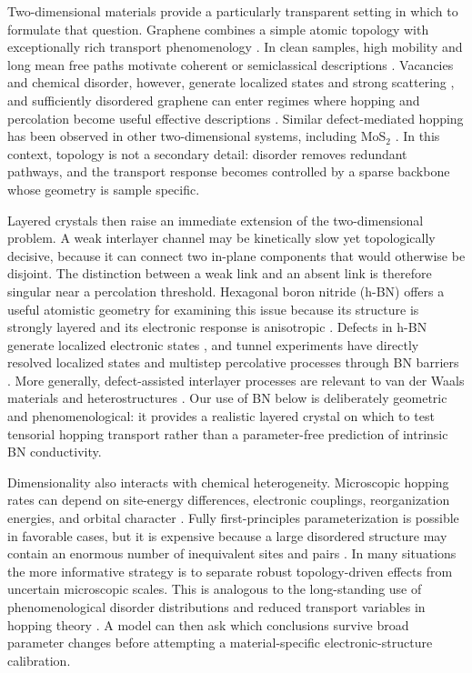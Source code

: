 \documentclass[aps,prmaterials,reprint,amsmath,amssymb,superscriptaddress,longbibliography]{revtex4-2}
\begin{document}
Two-dimensional materials provide a particularly transparent setting in which to formulate that question. Graphene combines a simple atomic topology with exceptionally rich transport phenomenology \cite{novoselov2004,geim2007,castroneto2009,peres2010}. In clean samples, high mobility and long mean free paths motivate coherent or semiclassical descriptions \cite{morozov2008,bolotin2008,hwang2008}. Vacancies and chemical disorder, however, generate localized states and strong scattering \cite{pereira2006,ugeda2010,chen2009}, and sufficiently disordered graphene can enter regimes where hopping and percolation become useful effective descriptions \cite{lherbier2008,lherbier2012,liang2012}. Similar defect-mediated hopping has been observed in other two-dimensional systems, including MoS$_2$ \cite{qiu2013}. In this context, topology is not a secondary detail: disorder removes redundant pathways, and the transport response becomes controlled by a sparse backbone whose geometry is sample specific.

Layered crystals then raise an immediate extension of the two-dimensional problem. A weak interlayer channel may be kinetically slow yet topologically decisive, because it can connect two in-plane components that would otherwise be disjoint. The distinction between a weak link and an absent link is therefore singular near a percolation threshold. Hexagonal boron nitride (h-BN) offers a useful atomistic geometry for examining this issue because its structure is strongly layered and its electronic response is anisotropic \cite{laturia2018,jiang2018}. Defects in h-BN generate localized electronic states \cite{huang2012,sajid2018}, and tunnel experiments have directly resolved localized states and multistep percolative processes through BN barriers \cite{greenaway2018}. More generally, defect-assisted interlayer processes are relevant to van der Waals materials and heterostructures \cite{prasad2023}. Our use of BN below is deliberately geometric and phenomenological: it provides a realistic layered crystal on which to test tensorial hopping transport rather than a parameter-free prediction of intrinsic BN conductivity.

Dimensionality also interacts with chemical heterogeneity. Microscopic hopping rates can depend on site-energy differences, electronic couplings, reorganization energies, and orbital character \cite{ruhle2011,slater1954}. Fully first-principles parameterization is possible in favorable cases, but it is expensive because a large disordered structure may contain an enormous number of inequivalent sites and pairs \cite{setyawan2010,ruhle2011}. In many situations the more informative strategy is to separate robust topology-driven effects from uncertain microscopic scales. This is analogous to the long-standing use of phenomenological disorder distributions and reduced transport variables in hopping theory \cite{shklovskii1984,bassler1993}. A model can then ask which conclusions survive broad parameter changes before attempting a material-specific electronic-structure calibration.
\end{document}
